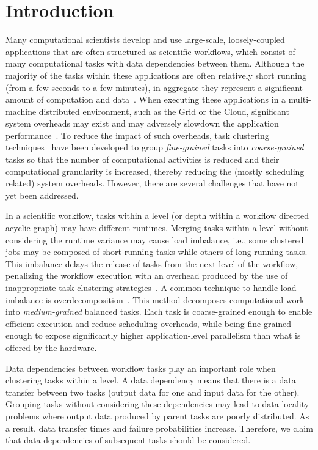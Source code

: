 
\section{Introduction}
\label{intro}
Many computational scientists develop and use large-scale, loosely-coupled applications that are often structured as scientific workflows, which consist of many computational tasks with data dependencies between them. Although the majority of the tasks within these applications are often relatively short running (from a few seconds to a few minutes), in aggregate they represent a significant amount of computation and data~\cite{daSilva:2013:TFO:2534248.2534254,Juve2013}. When executing these applications in a multi-machine distributed environment, such as the Grid or the Cloud, significant system overheads may exist and may adversely slowdown the application performance~\cite{Chen2011}. To reduce the impact of such overheads, task clustering techniques~\cite{Muthuvelu:2005:DJG:1082290.1082297,4493929,Muthuvelu2010,Muthuvelu2013170,keat-2006,ang-2009,Liu2009,Singh:2008:WTC:1341811.1341822,Ferreira-granularity-2013} have been developed to group \emph{fine-grained} tasks into \emph{coarse-grained} tasks so that the number of computational activities is reduced and their computational granularity is increased, thereby reducing the (mostly scheduling related) system overheads.
However, there are several challenges that have not yet been addressed.

In a scientific workflow, tasks within a level (or depth within a workflow directed acyclic graph) may have different runtimes. Merging tasks within a level without considering the runtime variance may cause load imbalance, i.e., some clustered jobs may be composed of short running tasks while others of long running tasks. This imbalance delays the release of tasks from the next level of the workflow, penalizing the workflow execution with an overhead produced by the use of inappropriate task clustering strategies~\cite{Chen2013}.
A common technique to handle load imbalance is overdecomposition~\cite{Lifflander}.
This method decomposes computational work into \emph{medium-grained} balanced tasks. Each task is coarse-grained enough to enable efficient execution and reduce scheduling overheads, while being fine-grained enough to expose significantly higher application-level parallelism than what is offered by the hardware. 

Data dependencies between workflow tasks play an important role when clustering tasks within a level. A data dependency means that there is a data transfer between two tasks (output data for one and input data for the other). Grouping tasks without considering these dependencies may lead to data locality problems where output data produced by parent tasks are poorly distributed. As a result, data transfer times and failure probabilities increase.
Therefore, we claim that data dependencies of subsequent tasks should be considered.

